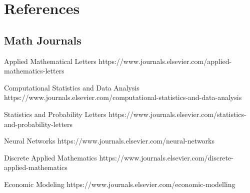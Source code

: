 \section{References}

\subsection{Math Journals}

 Applied Mathematical Letters
\newblock https://www.journals.elsevier.com/applied-mathematics-letters

Computational Statistics and Data Analysis
\newblock https://www.journals.elsevier.com/computational-statistics-and-data-analysis

Statistics and Probability Letters
\newblock https://www.journals.elsevier.com/statistics-and-probability-letters

Neural Networks
\newblock https://www.journals.elsevier.com/neural-networks

Discrete Applied Mathematics
\newblock https://www.journals.elsevier.com/discrete-applied-mathematics

Economic Modeling
\newblock https://www.journals.elsevier.com/economic-modelling



